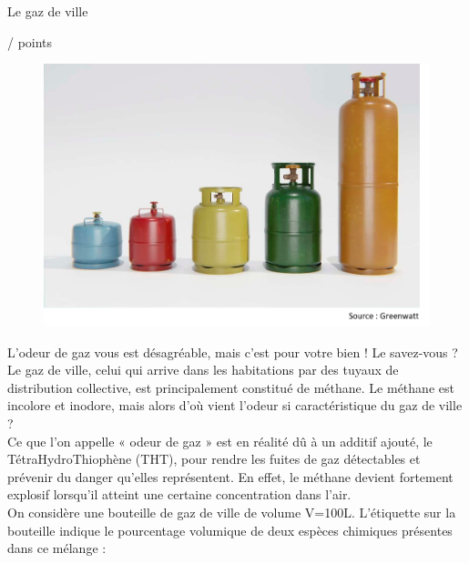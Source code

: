 \begin{doc}{Le gaz de ville \begin{large}
    / points
\end{large}}
\begin{figure}
\vspace{-0cm}
    \centering
      \includegraphics[scale=0.3]{Images/DS/Devoir_Commun/Bouteille_gaz.png}
  \end{figure}
L'odeur de gaz vous est désagréable, mais c'est pour votre bien ! Le savez-vous ?\\
Le gaz de ville, celui qui arrive dans les habitations par des tuyaux de distribution collective, est principalement constitué de méthane. Le méthane est incolore et inodore, mais alors d'où vient l'odeur si caractéristique du gaz de ville ?\\
Ce que l'on appelle « odeur de gaz » est en réalité dû à un additif ajouté, le TétraHydroThiophène (THT), pour rendre les fuites de gaz détectables et prévenir du danger qu’elles représentent. En effet, le méthane devient fortement explosif lorsqu'il atteint une certaine concentration dans l'air.\\

On considère une bouteille de gaz de ville de volume V=100L. L’étiquette sur la bouteille indique le pourcentage volumique de deux espèces chimiques présentes dans ce mélange :


\end{doc}
